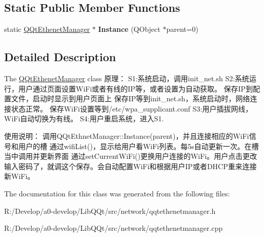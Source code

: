 \subsection*{Static Public Member Functions}
\begin{DoxyCompactItemize}
\item 
\mbox{\label{class_q_qt_ethenet_manager_a2bb5794eb2bd79751d7ed748735bed5f}} 
static \mbox{\hyperlink{class_q_qt_ethenet_manager}{Q\+Qt\+Ethenet\+Manager}} $\ast$ {\bfseries Instance} (Q\+Object $\ast$parent=0)
\end{DoxyCompactItemize}


\subsection{Detailed Description}
The \mbox{\hyperlink{class_q_qt_ethenet_manager}{Q\+Qt\+Ethenet\+Manager}} class 原理： S1\+:系统启动，调用init\+\_\+net.\+sh S2\+:系统运行，用户通过页面设置\+Wi\+Fi或者有线的\+I\+P等，或者设置为自动获取。 保存\+I\+P到配置文件，启动时显示到用户页面上 保存\+I\+P等到init\+\_\+net.\+sh，系统启动时，网络连接状态正常。 保存\+Wi\+Fi设置等到/etc/wpa\+\_\+supplicant.conf S3\+:用户插拔网线，\+Wi\+Fi自动切换为有线。 S4\+:用户重启系统，进入\+S1. 

使用说明： 调用\+Q\+Qt\+Ethnet\+Manager\+::\+Instance(parent)，并且连接相应的\+Wi\+Fi信号和用户的槽 通过wifi\+List()，显示给用户看\+Wi\+Fi列表。每5s自动更新一次。在槽当中调用并更新界面 通过set\+Current\+Wi\+Fi()更换用户连接的\+Wi\+Fi。用户点击更改输入密码了，就调这个保存。会自动配置\+Wi\+Fi和根据用户\+I\+P或者\+D\+H\+C\+P重来连接新\+Wi\+Fi。 

The documentation for this class was generated from the following files\+:\begin{DoxyCompactItemize}
\item 
R\+:/\+Develop/a0-\/develop/\+Lib\+Q\+Qt/src/network/qqtethenetmanager.\+h\item 
R\+:/\+Develop/a0-\/develop/\+Lib\+Q\+Qt/src/network/qqtethenetmanager.\+cpp\end{DoxyCompactItemize}
